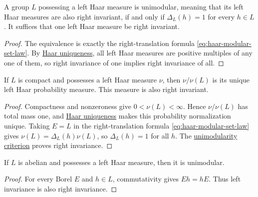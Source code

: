 \begin{corollary}[Unimodularity]\label{measure.haar-unimodular}
A group $L$ possessing a left Haar measure is unimodular, meaning that its left Haar measures are also right invariant, if and only if $\Delta_L(h)=1$ for every $h\in L$. It suffices that one left Haar measure be right invariant.
\end{corollary}

\begin{proof}
The equivalence is exactly the right-translation formula \eqref{eq:haar-modular-set-law}. By \hyperref[measure.haar-uniqueness]{Haar uniqueness}, all left Haar measures are positive multiples of any one of them, so right invariance of one implies right invariance of all.
\end{proof}

\begin{corollary}\label{measure.haar-compact}
If $L$ is compact and possesses a left Haar measure $\nu$, then $\nu/\nu(L)$ is its unique left Haar probability measure. This measure is also right invariant.
\end{corollary}

\begin{proof}
Compactness and nonzeroness give $0<\nu(L)<\infty$. Hence $\nu/\nu(L)$ has total mass one, and \hyperref[measure.haar-uniqueness]{Haar uniqueness} makes this probability normalization unique. Taking $E=L$ in the right-translation formula \eqref{eq:haar-modular-set-law} gives $\nu(L)=\Delta_L(h)\nu(L)$, so $\Delta_L(h)=1$ for all $h$. The \hyperref[measure.haar-unimodular]{unimodularity criterion} proves right invariance.
\end{proof}

\begin{corollary}\label{measure.haar-abelian}
If $L$ is abelian and possesses a left Haar measure, then it is unimodular.
\end{corollary}

\begin{proof}
For every Borel $E$ and $h\in L$, commutativity gives $Eh=hE$. Thus left invariance is also right invariance.
\end{proof}

